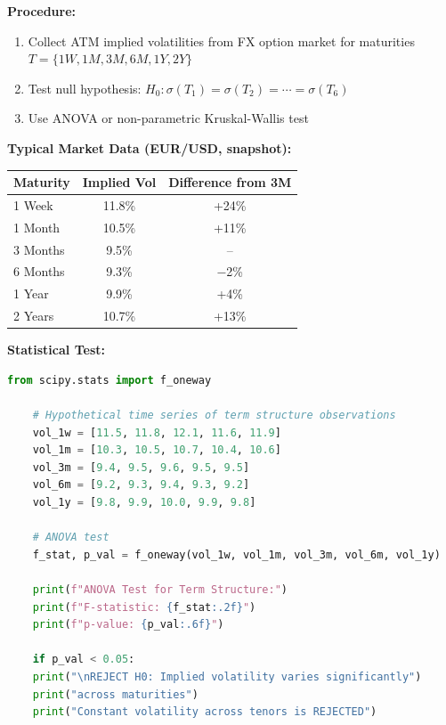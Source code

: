 \textbf{Procedure:}

\begin{enumerate}
	\item Collect ATM implied volatilities from FX option market for maturities $T = \{1W, 1M, 3M, 6M, 1Y, 2Y\}$
	\item Test null hypothesis: $H_0: \sigma(T_1) = \sigma(T_2) = \cdots = \sigma(T_6)$
	\item Use ANOVA or non-parametric Kruskal-Wallis test
\end{enumerate}

\textbf{Typical Market Data (EUR/USD, snapshot):}

\begin{center}
	\begin{tabular}{|l|c|c|}
		\hline
		\textbf{Maturity} & \textbf{Implied Vol} & \textbf{Difference from 3M} \\
		\hline
		1 Week & 11.8\% & +24\% \\
		1 Month & 10.5\% & +11\% \\
		3 Months & 9.5\% & -- \\
		6 Months & 9.3\% & $-$2\% \\
		1 Year & 9.9\% & +4\% \\
		2 Years & 10.7\% & +13\% \\
		\hline
	\end{tabular}
\end{center}

\textbf{Statistical Test:}

\begin{lstlisting}[language=Python, caption={ANOVA Test for Volatility Term Structure}]
	from scipy.stats import f_oneway
	
	# Hypothetical time series of term structure observations
	vol_1w = [11.5, 11.8, 12.1, 11.6, 11.9]
	vol_1m = [10.3, 10.5, 10.7, 10.4, 10.6]
	vol_3m = [9.4, 9.5, 9.6, 9.5, 9.5]
	vol_6m = [9.2, 9.3, 9.4, 9.3, 9.2]
	vol_1y = [9.8, 9.9, 10.0, 9.9, 9.8]
	
	# ANOVA test
	f_stat, p_val = f_oneway(vol_1w, vol_1m, vol_3m, vol_6m, vol_1y)
	
	print(f"ANOVA Test for Term Structure:")
	print(f"F-statistic: {f_stat:.2f}")
	print(f"p-value: {p_val:.6f}")
	
	if p_val < 0.05:
	print("\nREJECT H0: Implied volatility varies significantly")
	print("across maturities")
	print("Constant volatility across tenors is REJECTED")
\end{lstlisting}


